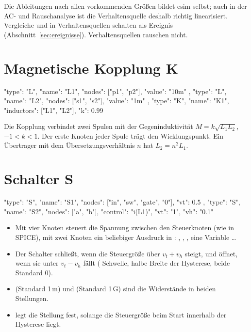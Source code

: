 Die Ableitungen nach allen vorkommenden Größen bildet esim selbst; auch in
der AC- und Rauschanalyse ist die Verhaltensquelle deshalb richtig
linearisiert. Vergleiche und  in Verhaltensquellen schalten als
Ereignis (Abschnitt~\ref{sec:ereignisse}). Verhaltensquellen rauschen
nicht.

\section{Magnetische Kopplung K}

\begin{json}
{ "type": "L", "name": "L1", "nodes": ["p1", "p2"], "value": "10m" },
{ "type": "L", "name": "L2", "nodes": ["s1", "s2"], "value": "1m" },
{ "type": "K", "name": "K1", "inductors": ["L1", "L2"], "k": 0.99 }
\end{json}

Die Kopplung verbindet zwei Spulen mit der Gegeninduktivität
$M = k\sqrt{L_1 L_2}$, $-1 < k < 1$. Der erste Knoten jeder Spule trägt den
Wicklungspunkt. Ein Übertrager mit dem Übersetzungsverhältnis $n$ hat
$L_2 = n^2 L_1$.

\section{Schalter S}
\label{sec:schalter}

\begin{json}
{ "type": "S", "name": "S1", "nodes": ["in", "sw", "gate", "0"], "vt": 0.5 },
{ "type": "S", "name": "S2", "nodes": ["a", "b"], "control": "i(L1)", "vt": "1", "vh": "0.1" }
\end{json}

\begin{itemize}
  \item Mit vier Knoten steuert die Spannung zwischen den Steuerknoten (wie
    in SPICE), mit zwei Knoten ein beliebiger Ausdruck in :
    , , , eine
    Variable \dots
  \item Der Schalter schließt, wenn die Steuergröße über $v_t + v_h$
    steigt, und öffnet, wenn sie unter $v_t - v_h$ fällt (
    Schwelle,  halbe Breite der Hysterese, beide Standard 0).
  \item {} (Standard 1\,m\ohm) und  (Standard
    1\,G\ohm) sind die Widerstände in beiden Stellungen.
  \item {} legt die Stellung fest, solange die
    Steuergröße beim Start innerhalb der Hysterese liegt.
\end{itemize}

